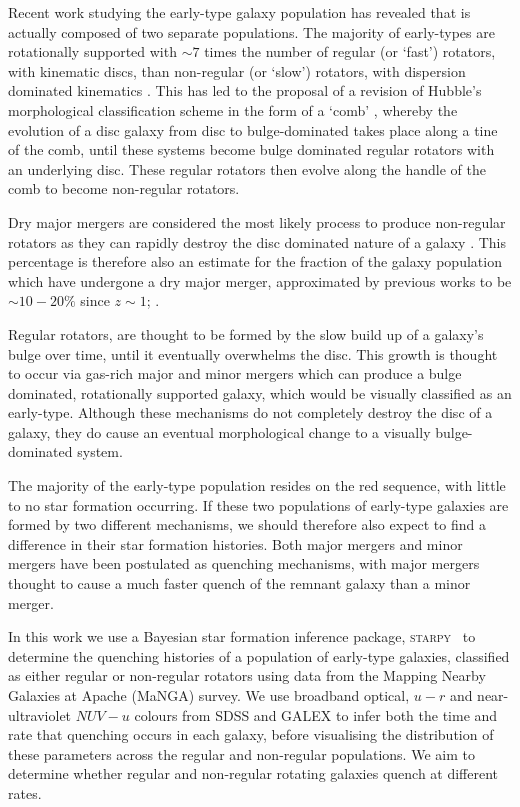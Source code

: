 \documentclass[useAMS,usenatbib]{mn2e}
\begin{document}
Recent work studying the early-type galaxy population has revealed that is actually composed of two separate populations. The majority of early-types are rotationally supported \citep{emsellem11} with $\sim7$ times the number of regular (or `fast') rotators, with kinematic discs, than non-regular (or `slow') rotators, with dispersion dominated kinematics \citep{cappellari07, emsellem07}.  This has led to the proposal of a revision of Hubble's morphological classification scheme in the form of a `comb' \citep{cappellari16}, whereby the evolution of a disc galaxy from  disc to bulge-dominated takes place along a tine of the comb, until these systems become bulge dominated regular rotators with an underlying disc. These regular rotators then evolve along the handle of the comb to become non-regular rotators. 

Dry major mergers are considered the most likely process to produce non-regular rotators \citep{duc11, naab14} as they can rapidly destroy the disc dominated nature of a galaxy \citep{toomre72}. This percentage is therefore also an estimate for the fraction of the galaxy population which have undergone a dry major merger, approximated by previous works to be $\sim10-20\%$ since $z\sim1$; \citep[][]{khochfar09}.

Regular rotators, are thought to be formed by the slow build up of a galaxy's bulge over time, until it eventually overwhelms the disc. This growth is thought to occur via gas-rich major and minor mergers \citep{duc11} which can produce a bulge dominated, rotationally supported galaxy, which would be visually classified as an early-type. Although these mechanisms do not completely destroy the disc of a galaxy, they do cause an eventual morphological change to a visually bulge-dominated system.

The majority of the early-type population resides on the red sequence, with little to no star formation occurring. If these two populations of early-type galaxies are formed by two different mechanisms, we should therefore also expect to find a difference in their star formation histories. Both major mergers and minor mergers have been postulated as quenching mechanisms, with major mergers thought to cause a much faster quench of the remnant galaxy than a minor merger. 

In this work we use a Bayesian star formation inference package, \textsc{starpy}~ to determine the quenching histories of a population of early-type galaxies, classified as either regular or non-regular rotators using data from the Mapping Nearby Galaxies at Apache (MaNGA) survey. We use broadband optical, $u-r$ and near-ultraviolet $NUV-u$ colours from SDSS and GALEX to infer both the time and rate that quenching occurs in each galaxy, before visualising the distribution of these parameters across the regular and non-regular populations. We aim to determine whether regular and non-regular rotating galaxies quench at different rates. 
\end{document}
